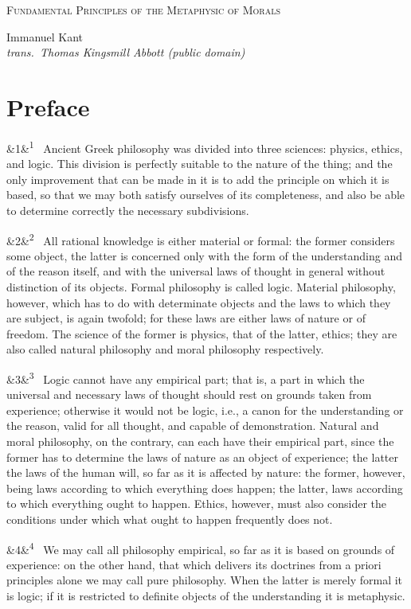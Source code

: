 \documentclass[12pt]{article}
\newcommand{\work}[1]{\begin{center}\LARGE\scshape #1\end{center}}
\newcommand{\attrib}[2]{\begin{center}\large #1\\[2pt]\small\itshape trans.\ #2\end{center}\vspace{1em}}
\newcommand{\para}[1][]{\par\noindent\ifx&#1&\else\textsuperscript{\footnotesize #1}~\fi}
\begin{document}
\work{Fundamental Principles of the Metaphysic of Morals}

\attrib{Immanuel Kant}{Thomas Kingsmill Abbott (public domain)}

\section*{Preface}

\para[1] Ancient Greek philosophy was divided into three sciences: physics, ethics, and logic. This division is perfectly suitable to the nature of the thing; and the only improvement that can be made in it is to add the principle on which it is based, so that we may both satisfy ourselves of its completeness, and also be able to determine correctly the necessary subdivisions.

\para[2] All rational knowledge is either material or formal: the former considers some object, the latter is concerned only with the form of the understanding and of the reason itself, and with the universal laws of thought in general without distinction of its objects. Formal philosophy is called logic. Material philosophy, however, which has to do with determinate objects and the laws to which they are subject, is again twofold; for these laws are either laws of nature or of freedom. The science of the former is physics, that of the latter, ethics; they are also called natural philosophy and moral philosophy respectively.

\para[3] Logic cannot have any empirical part; that is, a part in which the universal and necessary laws of thought should rest on grounds taken from experience; otherwise it would not be logic, i.e., a canon for the understanding or the reason, valid for all thought, and capable of demonstration. Natural and moral philosophy, on the contrary, can each have their empirical part, since the former has to determine the laws of nature as an object of experience; the latter the laws of the human will, so far as it is affected by nature: the former, however, being laws according to which everything does happen; the latter, laws according to which everything ought to happen. Ethics, however, must also consider the conditions under which what ought to happen frequently does not.

\para[4] We may call all philosophy empirical, so far as it is based on grounds of experience: on the other hand, that which delivers its doctrines from a priori principles alone we may call pure philosophy. When the latter is merely formal it is logic; if it is restricted to definite objects of the understanding it is metaphysic.
\end{document}
